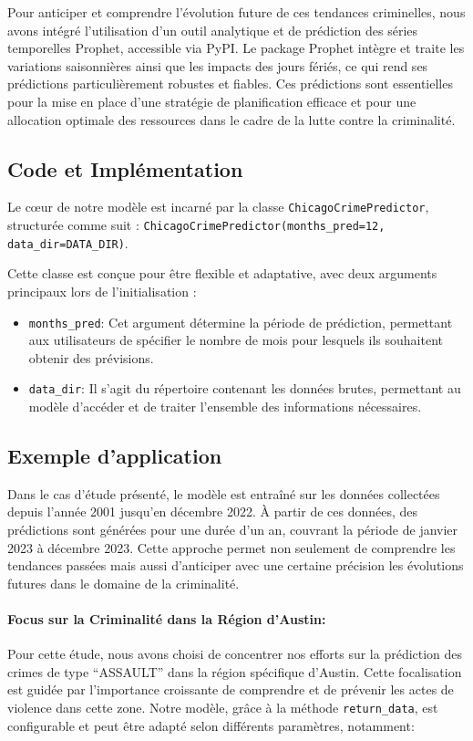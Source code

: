 \documentclass[12pt]{article}
\begin{document}
Pour anticiper et comprendre l'évolution future de ces tendances criminelles, nous avons intégré l'utilisation d'un outil analytique et de prédiction des séries temporelles Prophet, accessible via PyPI.
Le package Prophet  intègre et traite les variations saisonnières ainsi que les impacts des jours fériés, ce qui rend ses prédictions particulièrement robustes et fiables. Ces prédictions sont essentielles pour la mise en place d'une stratégie de planification efficace et pour une allocation optimale des ressources dans le cadre de la lutte contre la criminalité.

\subsection{Code et Implémentation}

Le cœur de notre modèle est incarné par la classe \texttt{ChicagoCrimePredictor}, structurée comme suit : \texttt{ChicagoCrimePredictor(months\_pred=12, data\_dir=DATA\_DIR)}.

Cette classe est conçue pour être flexible et adaptative, avec deux arguments principaux lors de l'initialisation :

\begin{itemize}
	\item \texttt{months\_pred}: Cet argument détermine la période de prédiction, permettant aux utilisateurs de spécifier le nombre de mois pour lesquels ils souhaitent obtenir des prévisions.
	\item \texttt{data\_dir}: Il s'agit du répertoire contenant les données brutes, permettant au modèle d'accéder et de traiter l'ensemble des informations nécessaires.
\end{itemize}

\subsection{Exemple d'application}

Dans le cas d'étude présenté, le modèle est entraîné sur les données collectées depuis l'année 2001 jusqu'en décembre 2022. À partir de ces données, des prédictions sont générées pour une durée d'un an, couvrant la période de janvier 2023 à décembre 2023. Cette approche permet non seulement de comprendre les tendances passées mais aussi d'anticiper avec une certaine précision les évolutions futures dans le domaine de la criminalité.

\paragraph{Focus sur la Criminalité dans la Région d'Austin:}
Pour cette étude, nous avons choisi de concentrer nos efforts sur la prédiction des crimes de type “ASSAULT” dans la région spécifique d'Austin. Cette focalisation est guidée par l'importance croissante de comprendre et de prévenir les actes de violence dans cette zone. Notre modèle, grâce à la méthode \texttt{return\_data}, est configurable et peut être adapté selon différents paramètres, notamment:
\end{document}
